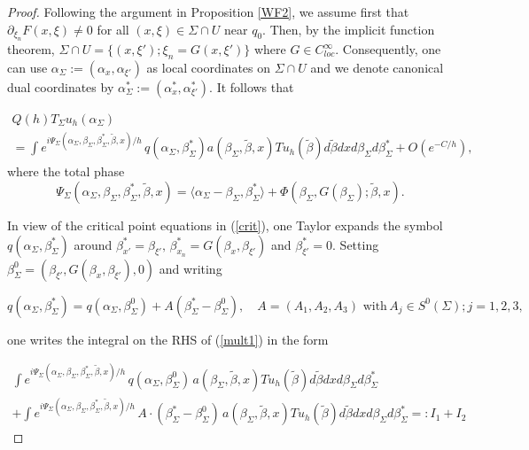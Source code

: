 \documentclass[11pt,reqno]{amsart}
\theoremstyle{definition}
\begin{document}
\begin{proof}
Following the argument in Proposition \ref{WF2}, we
assume first that $\partial_{\xi_n} F (x,\xi) \neq 0$ for all $(x,\xi) \in \Sigma \cap U$ near $q_0.$ Then, by the implicit function theorem, $ \Sigma \cap U = \{ (x, \xi'); \xi_n = G(x,\xi') \}$ where $G \in C^{\infty}_{loc}.$ Consequently, one can use $\alpha_{\Sigma} := (\alpha_x, \alpha_{\xi'})$ as local coordinates on $\Sigma \cap U$ and we denote canonical dual coordinates by $\alpha_{\Sigma}^*:= (\alpha_x^*,\alpha_{\xi'}^*).$ It follows that



\begin{align} \label{mult1}
Q(h) T_{\Sigma} u_h (\alpha_{\Sigma})  \hspace{4in} \nonumber \\
= \int e^{i \Psi_{\Sigma}(\alpha_{\Sigma}, \beta_{\Sigma}, \beta_{\Sigma}^*, \tilde{\beta},x)/h} \, q(\alpha_{\Sigma}, \beta_{\Sigma}^*) a (\beta_{\Sigma}, \tilde{\beta},x) Tu_h(\tilde{\beta}) d\tilde{\beta}  dx d\beta_{\Sigma} d \beta_{\Sigma}^*  + O(e^{-C/h}),
\end{align}
where the total phase
\begin{equation} \label{mult2}
\Psi_{\Sigma}(\alpha_{\Sigma}, \beta_{\Sigma},\beta_{\Sigma}^*, \tilde{\beta},x) = \langle \alpha_{\Sigma} - \beta_{\Sigma}, \beta_{\Sigma}^* \rangle + \Phi( \beta_\Sigma, G(\beta_{\Sigma}); \tilde{\beta},x).
\end{equation}

In view of the critical point equations in (\ref{crit}), one Taylor expands the symbol $q(\alpha_{\Sigma}, \beta_{\Sigma}^*)$ around $\beta_{x'}^* = \beta_{\xi'}, \, \beta_{x_n}^* = G(\beta_x, \beta_{\xi'})$ and $\beta_{\xi'}^* = 0.$ Setting $\beta_{\Sigma}^{0} = (  \beta_{\xi'},  G(\beta_x, \beta_{\xi'}), 0)$ and writing

$$ 
q(\alpha_{\Sigma}, \beta_{\Sigma}^*) = q(\alpha_{\Sigma}, \beta_{\Sigma}^{0}) + A ( \beta^{*}_{\Sigma} - \beta_{\Sigma}^{0}  ), \quad A = (A_1,A_2,A_3) \text{ with} \, A_j \in S^{0}(\Sigma); j=1,2,3,
$$

one writes the integral on the RHS of (\ref{mult1}) in the form


\begin{align} \label{mult3}
 \int e^{i \Psi_{\Sigma}(\alpha_{\Sigma}, \beta_{\Sigma}, \beta_{\Sigma}^*, \tilde{\beta},x)/h} \, q(\alpha_{\Sigma}, \beta_{\Sigma}^{0}) \, a (\beta_{\Sigma}, \tilde{\beta},x) Tu_h(\tilde{\beta}) d\tilde{\beta}  dx d\beta_{\Sigma} d \beta_{\Sigma}^* \nonumber \\
 + \int e^{i \Psi_{\Sigma}(\alpha_{\Sigma}, \beta_{\Sigma}, \beta_{\Sigma}^*, \tilde{\beta},x)/h} \, A \cdot ( \beta^{*}_{\Sigma} - \beta_{\Sigma}^{0}  )  \, a (\beta_{\Sigma}, \tilde{\beta},x) Tu_h(\tilde{\beta}) d\tilde{\beta}  dx d\beta_{\Sigma} d \beta_{\Sigma}^*=: I_1 + I_2
\end{align}



\end{proof}
\end{document}
